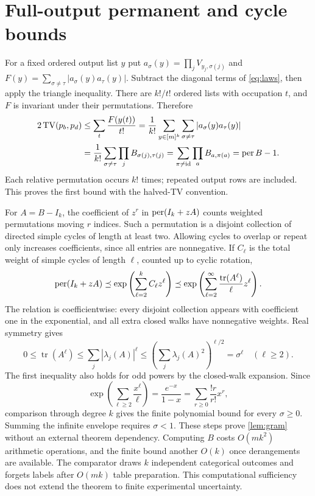\section{Full-output permanent and cycle bounds}\label{app:gram}
For a fixed ordered output list $y$ put $a_\sigma(y)=\prod_jV_{y_j,\sigma(j)}$ and $F(y)=\sum_{\sigma\ne\tau}|a_\sigma(y)a_\tau(y)|$. Subtract the diagonal terms of \cref{eq:laws}, then apply the triangle inequality. There are $k!/t!$ ordered lists with occupation $t$, and $F$ is invariant under their permutations. Therefore
\begin{align}
 2\operatorname{TV}(p_b,p_d)&\le\sum_t\frac{F(y(t))}{t!}
 =\frac1{k!}\sum_{y\in[m]^k}\sum_{\sigma\ne\tau}|a_\sigma(y)a_\tau(y)|\nonumber\\
 &=\frac1{k!}\sum_{\sigma\ne\tau}\prod_j B_{\sigma(j),\tau(j)}
 =\sum_{\pi\ne\mathrm{id}}\prod_a B_{a,\pi(a)}=\operatorname{per} B-1.
\end{align}
Each relative permutation occurs $k!$ times; repeated output rows are included. This proves the first bound with the halved-TV convention.

For $A=B-I_k$, the coefficient of $z^r$ in $\operatorname{per}(I_k+zA)$ counts weighted permutations moving $r$ indices. Such a permutation is a disjoint collection of directed simple cycles of length at least two. Allowing cycles to overlap or repeat only increases coefficients, since all entries are nonnegative. If $C_\ell$ is the total weight of simple cycles of length $\ell$, counted up to cyclic rotation,
\begin{equation}
 \operatorname{per}(I_k+zA)\preceq\exp\left(\sum_{\ell=2}^k C_\ell z^\ell\right)
 \preceq\exp\left(\sum_{\ell=2}^\infty\frac{\operatorname{tr}(A^\ell)}\ell z^\ell\right).
\end{equation}
The relation is coefficientwise: every disjoint collection appears with coefficient one in the exponential, and all extra closed walks have nonnegative weights. Real symmetry gives
\begin{equation}
 0\le\operatorname{tr}(A^\ell)\le\sum_j|\lambda_j(A)|^\ell
 \le\left(\sum_j\lambda_j(A)^2\right)^{\ell/2}=\sigma^\ell\quad(\ell\ge2).
\end{equation}
The first inequality also holds for odd powers by the closed-walk expansion. Since
\begin{equation}
 \exp\left(\sum_{\ell\ge2}\frac{x^\ell}{\ell}\right)
 =\frac{e^{-x}}{1-x}=\sum_{r\ge0}\frac{!r}{r!}x^r,
\end{equation}
comparison through degree $k$ gives the finite polynomial bound for every $\sigma\ge0$. Summing the infinite envelope requires $\sigma<1$. These steps prove \cref{lem:gram} without an external theorem dependency. Computing $B$ costs $O(mk^2)$ arithmetic operations, and the finite bound another $O(k)$ once derangements are available. The comparator draws $k$ independent categorical outcomes and forgets labels after $O(mk)$ table preparation. This computational sufficiency does not extend the theorem to finite experimental uncertainty.

